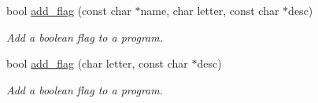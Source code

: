 {\bf }\par
\begin{DoxyCompactItemize}
\item 
bool \hyperlink{class_anyarg_a15625aae27eac8deb3b8b6fd1adf70c4}{add\-\_\-flag} (const char $\ast$name, char letter, const char $\ast$desc)
\begin{DoxyCompactList}\small\item\em Add a boolean flag to a program. \end{DoxyCompactList}\item 
bool \hyperlink{class_anyarg_ab3d325be34ce29d29d890e240b3f592b}{add\-\_\-flag} (char letter, const char $\ast$desc)
\begin{DoxyCompactList}\small\item\em Add a boolean flag to a program. \end{DoxyCompactList}\end{DoxyCompactItemize}

